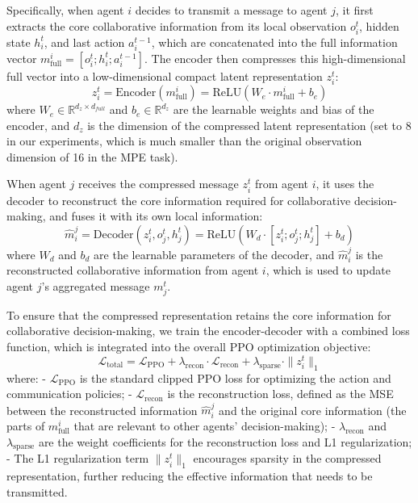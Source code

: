 \documentclass[10pt, twocolumn]{IEEEtran}
\begin{document}
Specifically, when agent $i$ decides to transmit a message to agent $j$, it first extracts the core collaborative information from its local observation $o_i^t$, hidden state $h_i^t$, and last action $a_i^{t-1}$, which are concatenated into the full information vector $m_{\text{full}}^i = [o_i^t; h_i^t; a_i^{t-1}]$. The encoder then compresses this high-dimensional full vector into a low-dimensional compact latent representation $z_i^t$:
\begin{equation}
z_i^t = \text{Encoder}(m_{\text{full}}^i) = \text{ReLU}(W_e \cdot m_{\text{full}}^i + b_e)
\end{equation}
where $W_e \in \mathbb{R}^{d_z \times d_{full}}$ and $b_e \in \mathbb{R}^{d_z}$ are the learnable weights and bias of the encoder, and $d_z$ is the dimension of the compressed latent representation (set to 8 in our experiments, which is much smaller than the original observation dimension of 16 in the MPE task).

When agent $j$ receives the compressed message $z_i^t$ from agent $i$, it uses the decoder to reconstruct the core information required for collaborative decision-making, and fuses it with its own local information:
\begin{equation}
\hat{m}_i^j = \text{Decoder}(z_i^t, o_j^t, h_j^t) = \text{ReLU}(W_d \cdot [z_i^t; o_j^t; h_j^t] + b_d)
\end{equation}
where $W_d$ and $b_d$ are the learnable parameters of the decoder, and $\hat{m}_i^j$ is the reconstructed collaborative information from agent $i$, which is used to update agent $j$'s aggregated message $m_j^t$.

To ensure that the compressed representation retains the core information for collaborative decision-making, we train the encoder-decoder with a combined loss function, which is integrated into the overall PPO optimization objective:
\begin{equation}
\mathcal{L}_{\text{total}} = \mathcal{L}_{\text{PPO}} + \lambda_{\text{recon}} \cdot \mathcal{L}_{\text{recon}} + \lambda_{\text{sparse}} \cdot \|z_i^t\|_1
\end{equation}
where:
- $\mathcal{L}_{\text{PPO}}$ is the standard clipped PPO loss for optimizing the action and communication policies;
- $\mathcal{L}_{\text{recon}}$ is the reconstruction loss, defined as the MSE between the reconstructed information $\hat{m}_i^j$ and the original core information (the parts of $m_{\text{full}}^i$ that are relevant to other agents' decision-making);
- $\lambda_{\text{recon}}$ and $\lambda_{\text{sparse}}$ are the weight coefficients for the reconstruction loss and L1 regularization;
- The L1 regularization term $\|z_i^t\|_1$ encourages sparsity in the compressed representation, further reducing the effective information that needs to be transmitted.
\end{document}
